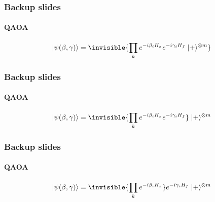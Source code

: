 \documentclass {beamer}
\newcommand {\qvec}[1] {\vert #1 \rangle}
\begin{document}
\begin {frame}
\frametitle {Backup slides}
\framesubtitle {QAOA}

\begin {align*}
\qvec{\psi(\beta, \gamma)} =
\invisible{\prod_{k} e^{-i \beta_i H_x} e^{-i \gamma_i H_f}
\; \qvec{+}^{\otimes m}}
\end {align*}

\centering
\begin {tikzpicture}
\node [scale=0.7]	{
	\begin {quantikz}
	&
	\\
	&
	\\
	&
	\end {quantikz}
};
\end {tikzpicture}
\end {frame}
\begin {frame}
\frametitle {Backup slides}
\framesubtitle {QAOA}

\begin {align*}
\qvec{\psi(\beta, \gamma)} =
\invisible{\prod_{k} e^{-i \beta_i H_x} e^{-i \gamma_i H_f}}
\; \qvec{+}^{\otimes m}
\end {align*}

\centering
{}
\end {frame}

\begin {frame}
\frametitle {Backup slides}
\framesubtitle {QAOA}

\begin {align*}
\qvec{\psi(\beta, \gamma)} =
\invisible{\prod_{k} e^{-i \beta_i H_x}} e^{-i \gamma_i H_f}
\; \qvec{+}^{\otimes m}
\end {align*}

\centering
{}
\end {frame}
\end{document}
